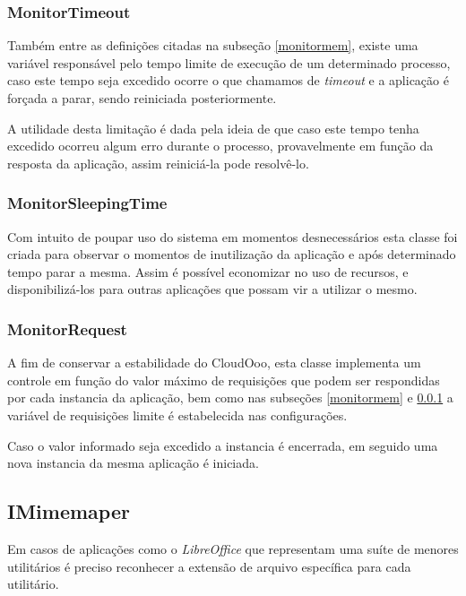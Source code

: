 {\subsubsection{MonitorTimeout}
\label{monitortim}

Também entre as definições citadas na subseção \ref{monitormem}, existe uma variável responsável pelo tempo limite de execução de um determinado processo, caso este tempo seja excedido ocorre o que chamamos de \textit{timeout} e a aplicação é forçada a parar, sendo reiniciada posteriormente.

A utilidade desta limitação é dada pela ideia de que caso este tempo tenha excedido ocorreu algum erro durante o processo, provavelmente em função da resposta da aplicação, assim reiniciá-la pode resolvê-lo.


\subsubsection{MonitorSleepingTime}

Com intuito de poupar uso do sistema em momentos desnecessários esta classe foi criada para observar o momentos de inutilização da aplicação e após determinado tempo parar a mesma. Assim é possível economizar no uso de recursos, e disponibilizá-los para outras aplicações que possam vir a utilizar o mesmo.


\subsubsection{MonitorRequest}

A fim de conservar a estabilidade do CloudOoo, esta classe implementa um controle em função do valor máximo de requisições que podem ser respondidas por cada instancia da aplicação, bem como nas subseções \ref{monitormem} e \ref{monitortim} a variável de requisições limite é estabelecida nas configurações.

Caso o valor informado seja excedido a instancia é encerrada, em seguido uma nova instancia da mesma aplicação é iniciada.


\subsection{IMimemaper}

Em casos de aplicações como o \textit{LibreOffice} que representam uma suíte de menores utilitários é preciso reconhecer a extensão de arquivo específica para cada utilitário. 

}
